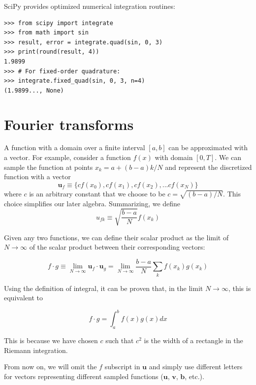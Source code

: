 \documentclass[justified, sixbynine]{tufte-book}
\theoremstyle{plain}%
\newtheorem * {corollary}{Corollary}
\theoremstyle{definition}
\theoremstyle{remark}
\newtheorem * {remark}{Remark}
\newtheorem * {note}{Note}
\begin{document}
\begin{fullwidth}
SciPy provides optimized numerical integration routines:

\begin{lstlisting}
>>> from scipy import integrate
>>> from math import sin
>>> result, error = integrate.quad(sin, 0, 3)
>>> print(round(result, 4))
1.9899
>>> # For fixed-order quadrature:
>>> integrate.fixed_quad(sin, 0, 3, n=4)
(1.9899..., None)
\end{lstlisting}

\newpage
\section{Fourier transforms}

A function with a domain over a finite interval $[a, b]$ can be approximated with a vector. For example, consider a function $f(x)$ with domain $[0, T]$. We can sample the function at points $x_k = a+(b-a)k/N$ and represent the discretized function with a vector
\begin{equation}
\mathbf{u}_f \equiv \{cf(x_0), cf(x_1), cf(x_2), ... cf(x_N)\}
\end{equation}
where $c$ is an arbitrary constant that we choose to be $c=\sqrt{(b-a)/N}$. This choice simplifies our later algebra.
Summarizing, we define
\begin{equation}
u_{fk} \equiv \sqrt{\frac{b-a}{N}}f(x_k)
\end{equation}

Given any two functions, we can define their scalar product as the limit of $N\rightarrow\infty$ of the scalar product between their corresponding vectors:

\begin{equation}
f \cdot g \equiv \lim_{N\rightarrow\infty} \mathbf{u}_f \cdot \mathbf{u}_g =
\lim_{N\rightarrow\infty} \frac{b-a}{N} \sum_k f(x_k) g(x_k)
\end{equation}

Using the definition of integral, it can be proven that, in the limit $N\rightarrow\infty$, this is equivalent to

\begin{equation}
f \cdot g = \int_a^b f(x) g(x) dx
\end{equation}

This is because we have chosen $c$ such that $c^2$ is the width of a rectangle in the Riemann integration.

From now on, we will omit the $f$ subscript in $\mathbf{u}$ and simply use different letters for vectors representing different sampled functions ($\mathbf{u}$, $\mathbf{v}$, $\mathbf{b}$, etc.).


\end{fullwidth}
\end{document}
